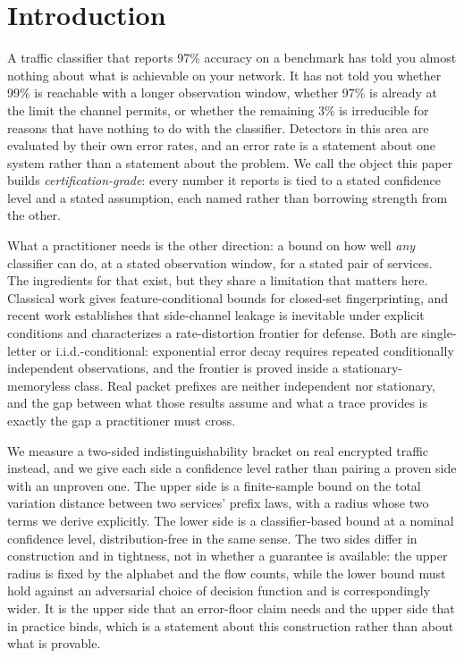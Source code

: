 \section{Introduction}
\label{sec:intro}

A traffic classifier that reports 97\% accuracy on a benchmark has told you
almost nothing about what is achievable on your network. It has not told you
whether 99\% is reachable with a longer observation window, whether 97\% is
already at the limit the channel permits, or whether the remaining 3\% is
irreducible for reasons that have nothing to do with the classifier. Detectors
in this area are evaluated by their own error rates, and an error rate is a
statement about one system rather than a statement about the problem. We call the
object this paper builds \emph{certification-grade}: every number it reports is
tied to a stated confidence level and a stated assumption, each named rather than
borrowing strength from the other.

What a practitioner needs is the other direction: a bound on how well
\emph{any} classifier can do, at a stated observation window, for a stated pair
of services. The ingredients for that exist, but they share a limitation that
matters here. Classical work gives feature-conditional bounds for closed-set
fingerprinting, and recent work establishes that side-channel leakage is
inevitable under explicit conditions and characterizes a rate-distortion
frontier for defense. Both are single-letter or i.i.d.-conditional: exponential
error decay requires repeated conditionally independent observations, and the
frontier is proved inside a stationary-memoryless class. Real packet prefixes
are neither independent nor stationary, and the gap between what those results
assume and what a trace provides is exactly the gap a practitioner must cross.

We measure a two-sided indistinguishability bracket on real encrypted traffic
instead, and we give each side a confidence level rather than pairing a proven
side with an unproven one. The upper side is a finite-sample bound on the total
variation distance between two services' prefix laws, with a radius whose two
terms we derive explicitly. The lower side is a classifier-based bound at a
nominal confidence level, distribution-free in the same sense. The two sides
differ in construction and in tightness, not in whether a guarantee is
available: the upper radius is fixed by the alphabet and the flow counts, while
the lower bound must hold against an adversarial choice of decision function and
is correspondingly wider. It is the upper side that an error-floor claim needs
and the upper side that in practice binds, which is a statement about this
construction rather than about what is provable.


